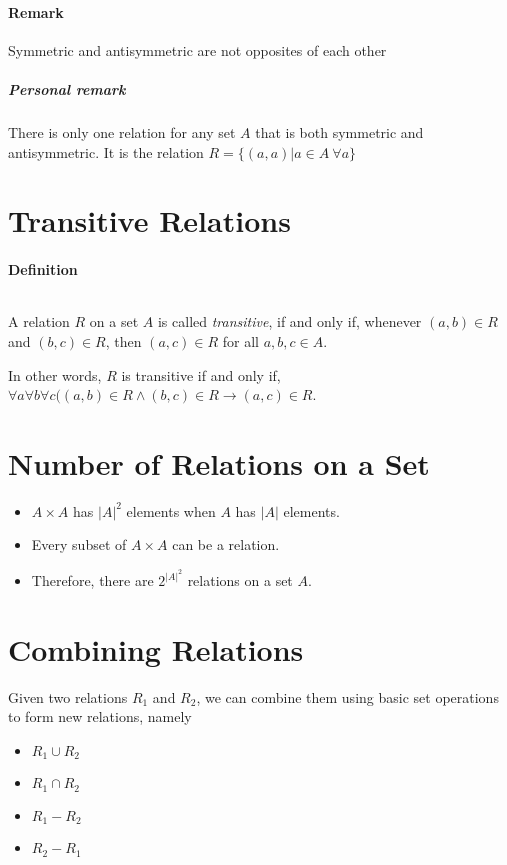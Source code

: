 \documentclass[10pt,a4paper]{book}
\begin{document}
\paragraph*{Remark}
Symmetric and antisymmetric are not opposites of each other
 
\subparagraph*{Personal remark}
There is only one relation for any set $A$ that is both symmetric and antisymmetric. It is the relation $R = \{(a,a)|a \in A \ \forall a\}$

\section{Transitive Relations}

\paragraph*{Definition}
$\ $\par
A relation $R$ on a set $A$ is called \textit{transitive}, if and only if, whenever $(a,b) \in R$ and $(b,c) \in R$, then $(a,c) \in R$ for all $a,b,c \in A$.\par
In other words, $R$ is transitive if and only if, $\forall a \forall b \forall c ((a,b) \in R \land (b,c) \in R \to (a,c) \in R$.

\section{Number of Relations on a Set}
\begin{itemize}
\item $A \times A$ has $|A|^2$ elements when $A$ has $|A|$ elements.
\item Every subset of $A \times A$ can be a relation.
\item Therefore, there are $2^{{|A|}^2}$ relations on a set $A$.
\end{itemize}

\section{Combining Relations}
Given two relations $R_1$ and $R_2$, we can combine them using basic set operations to form new relations, namely
\begin{itemize}
\item $R_1 \cup R_2$
\item $R_1 \cap R_2$
\item $R_1 - R_2$
\item $R_2 - R_1$
\end{itemize}
\end{document}
